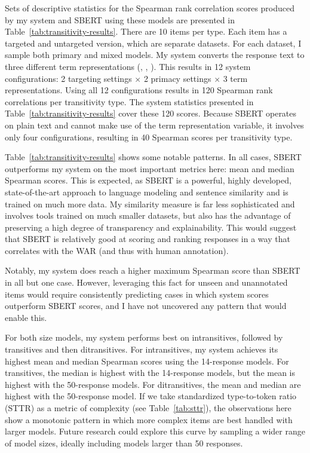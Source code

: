 Sets of descriptive statistics for the Spearman rank correlation scores produced by my system and SBERT using these models are presented in Table~\ref{tab:transitivity-results}. There are 10 items per type. Each item has a targeted and untargeted version, which are separate datasets. For each dataset, I sample both primary and mixed models. My system converts the response text to three different term representations (, , ). This results in 12 system configurations: 2 targeting settings $\times$ 2 primacy settings $\times$ 3 term representations. Using all 12 configurations results in 120 Spearman rank correlations per transitivity type. The system statistics presented in Table~\ref{tab:transitivity-results} cover these 120 scores. Because SBERT operates on plain text and cannot make use of the term representation variable, it involves only four configurations, resulting in 40 Spearman scores per transitivity type.

Table~\ref{tab:transitivity-results} shows some notable patterns. In all cases, SBERT outperforms my system on the most important metrics here: mean and median Spearman scores. This is expected, as SBERT is a powerful, highly developed, state-of-the-art approach to language modeling and sentence similarity and is trained on much more data. My similarity measure is far less sophisticated and involves tools trained on much smaller datasets, but also has the advantage of preserving a high degree of transparency and explainability. This would suggest that SBERT is relatively good at scoring and ranking responses in a way that correlates with the WAR (and thus with human annotation).

Notably, my system does reach a higher maximum Spearman score than SBERT in all but one case. However, leveraging this fact for unseen and unannotated items would require consistently predicting cases in which system scores outperform SBERT scores, and I have not uncovered any pattern that would enable this.

For both size models, my system performs best on intransitives, followed by transitives and then ditransitives. For intransitives, my system achieves its highest mean and median Spearman scores using the 14-response models. For transitives, the median is highest with the 14-response models, but the mean is highest with the 50-response models. For ditransitives, the mean and median are highest with the 50-response model. If we take standardized type-to-token ratio (STTR) as a metric of complexity (see Table~\ref{tab:sttr}), the observations here show a monotonic pattern in which more complex items are best handled with larger models. Future research could explore this curve by sampling a wider range of model sizes, ideally including models larger than 50 responses.

